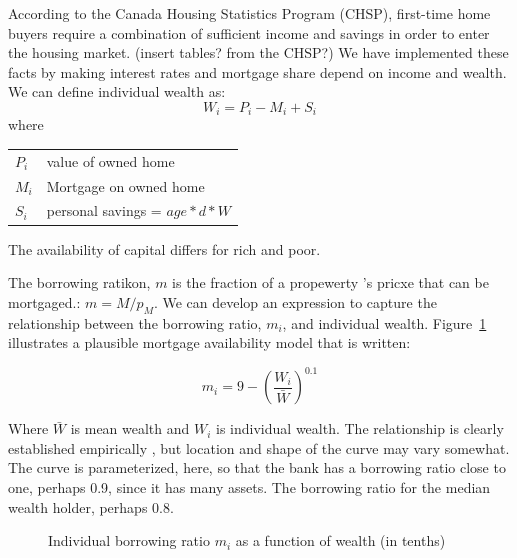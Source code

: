 According to the Canada Housing Statistics Program (CHSP), first-time home buyers require a combination of sufficient income and savings in order to enter the housing market. (insert tables? from the CHSP?) We have implemented these facts by making interest rates and mortgage share depend on income and wealth.
We can define individual wealth as:
\[W_i= P_i -M_i  +S_i\]
where 

\begin{tabular}{ll}
$P_i$ & value of owned home\\
$M_i$ & Mortgage on owned home\\
$S_i$ & personal savings = $age*d*W$\\
\end{tabular}

The availability of capital differs for rich and poor. 

The borrowing ratikon, $m$ is the fraction of a propewerty 's pricxe that can be mortgaged.: $m=M/p_M$. We can develop an expression to capture the relationship between the \gls{borrowing ratio}, $m_i$,  and individual wealth. Figure~\ref{fig-borrowing-ratio} illustrates a plausible mortgage availability  model that is written:

 \[ m_i = 9-\left(\frac{W_i}{\bar W}\right)^{0.1} \]

 
Where $\bar{W}$ is mean wealth and $W_i$ is individual wealth. 
The relationship is clearly established empirically \cite{}, but location and shape of the curve may vary somewhat. The curve is parameterized, here, so that the bank has a borrowing ratio close to one, perhaps 0.9, since it has many assets. The borrowing ratio for the median wealth holder, perhaps 0.8.



\begin{figure}[htb]
\caption{Individual borrowing ratio $m_i$ as a function of wealth (in tenths)}
 \label{fig-borrowing-ratio}
\end{figure}


